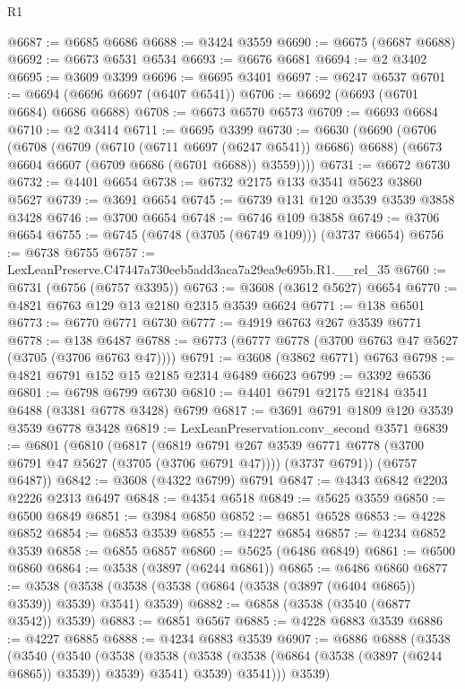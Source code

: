 \begin{lexlean}{R1}
\begin{coremodule}
@6687 := @6685 @6686
@6688 := @3424 @3559
@6690 := @6675 (@6687 @6688)
@6692 := @6673 @6531 @6534
@6693 := @6676 @6681
@6694 := @2 @3402
@6695 := @3609 @3399
@6696 := @6695 @3401
@6697 := @6247 @6537
@6701 := @6694 (@6696 @6697 (@6407 @6541))
@6706 := @6692 (@6693 (@6701 @6684) @6686 @6688)
@6708 := @6673 @6570 @6573
@6709 := @6693 @6684
@6710 := @2 @3414
@6711 := @6695 @3399
@6730 := @6630
    (@6690
      (@6706
        (@6708
          (@6709 (@6710 (@6711 @6697 (@6247 @6541)) @6686) @6688)
          (@6673 @6604 @6607 (@6709 @6686 (@6701 @6688)) @3559))))
@6731 := @6672 @6730
@6732 := @4401 @6654
@6738 := @6732 @2175 @133 @3541 @5623 @3860 @5627
@6739 := @3691 @6654
@6745 := @6739 @131 @120 @3539 @3539 @3858 @3428
@6746 := @3700 @6654
@6748 := @6746 @109 @3858
@6749 := @3706 @6654
@6755 := @6745 (@6748 (@3705 (@6749 @109))) (@3737 @6654)
@6756 := @6738 @6755
@6757 := LexLeanPreserve.C47447a730eeb5add3aca7a29ea9e695b.R1.__rel_35
@6760 := @6731 (@6756 (@6757 @3395))
@6763 := @3608 (@3612 @5627) @6654
@6770 := @4821 @6763 @129 @13 @2180 @2315 @3539 @6624
@6771 := @138 @6501
@6773 := @6770 @6771 @6730
@6777 := @4919 @6763 @267 @3539 @6771
@6778 := @138 @6487
@6788 := @6773 (@6777 @6778 (@3700 @6763 @47 @5627 (@3705 (@3706 @6763 @47))))
@6791 := @3608 (@3862 @6771) @6763
@6798 := @4821 @6791 @152 @15 @2185 @2314 @6489 @6623
@6799 := @3392 @6536
@6801 := @6798 @6799 @6730
@6810 := @4401 @6791 @2175 @2184 @3541 @6488 (@3381 @6778 @3428) @6799
@6817 := @3691 @6791 @1809 @120 @3539 @3539 @6778 @3428
@6819 := LexLeanPreservation.conv_second @3571
@6839 := @6801
    (@6810
      (@6817
        (@6819 @6791 @267 @3539 @6771 @6778 (@3700 @6791 @47 @5627 (@3705 (@3706 @6791 @47))))
        (@3737 @6791))
      (@6757 @6487))
@6842 := @3608 (@4322 @6799) @6791
@6847 := @4343 @6842 @2203 @2226 @2313 @6497
@6848 := @4354 @6518
@6849 := @5625 @3559
@6850 := @6500 @6849
@6851 := @3984 @6850
@6852 := @6851 @6528
@6853 := @4228 @6852
@6854 := @6853 @3539
@6855 := @4227 @6854
@6857 := @4234 @6852 @3539
@6858 := @6855 @6857
@6860 := @5625 (@6486 @6849)
@6861 := @6500 @6860
@6864 := @3538 (@3897 (@6244 @6861))
@6865 := @6486 @6860
@6877 := @3538 (@3538 (@3538 (@3538 (@6864 (@3538 (@3897 (@6404 @6865)) @3539)) @3539) @3541) @3539)
@6882 := @6858 (@3538 (@3540 (@6877 @3542)) @3539)
@6883 := @6851 @6567
@6885 := @4228 @6883 @3539
@6886 := @4227 @6885
@6888 := @4234 @6883 @3539
@6907 := @6886
    @6888
    (@3538
      (@3540
        (@3540
          (@3538
            (@3538 (@3538 (@3538 (@6864 (@3538 (@3897 (@6244 @6865)) @3539)) @3539) @3541) @3539)
            @3541)))
      @3539)

\end{coremodule}
\end{lexlean}

